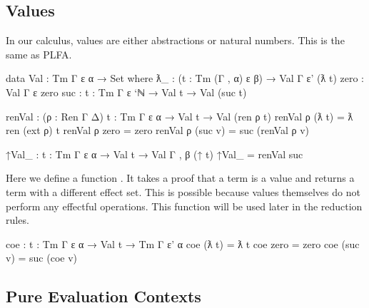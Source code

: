 \documentclass[a4paper,11pt]{article}
\newcommand\fun[1]{{\AgdaFunction{#1}}}
\begin{document}
\subsection{Values}

In our calculus, values are either abstractions or natural numbers. This is the same as PLFA.
\begin{code}
  data Val : Tm Γ ε α → Set where
    ƛ_ : (t : Tm (Γ , α) ε β) → Val {Γ} {ε'} (ƛ t)
    zero : Val {Γ} {ε} zero
    suc : {t : Tm Γ ε `ℕ} → Val t → Val (suc t)
\end{code}
\begin{code}[hide]
  renVal : (ρ : Ren Γ Δ) {t : Tm Γ ε α} → Val t → Val (ren ρ t)
  renVal ρ (ƛ t) = ƛ ren (ext ρ) t
  renVal ρ zero = zero
  renVal ρ (suc v) = suc (renVal ρ v)

  ↑Val_ : {t : Tm Γ ε α} → Val t → Val {Γ , β} (↑ t)
  ↑Val_ = renVal suc
\end{code}
Here we define a function \fun{coe}. It takes a proof that a term is a value and returns a term with a different effect set. This is possible because values themselves do not perform any effectful operations. This function will be used later in the reduction rules.
\begin{code}
  coe : {t : Tm Γ ε α} → Val t → Tm Γ ε' α
  coe (ƛ t) = ƛ t
  coe zero = zero
  coe (suc v) = suc (coe v)
\end{code}

\subsection{Pure Evaluation Contexts}
\end{document}
